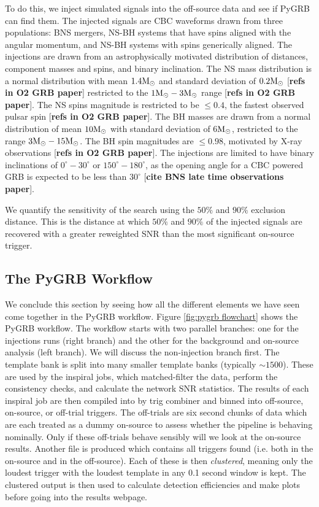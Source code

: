 \documentclass[11pt]{cuthesis}
\begin{document}
To do this, we inject simulated signals into the off-source data and see if PyGRB can find them. The injected signals are CBC waveforms drawn from three populations: BNS mergers, NS-BH systems that have spins aligned with the angular momentum, and NS-BH systems with spins generically aligned. The injections are drawn from an astrophysically motivated distribution of distances, component masses and spins, and binary inclination. The NS mass distribution is a normal distribution with mean $1.4 \textup{M}_\odot$ and standard deviation of $0.2 \textup {M}_\odot$ [\textbf{refs in O2 GRB paper}] restricted to the $1 \textup{M}_\odot-3\textup {M}_\odot$ range [\textbf{refs in O2 GRB paper}]. The NS spins magnitude is restricted to be $\leq 0.4$, the fastest observed pulsar spin [\textbf{refs in O2 GRB paper}]. The BH masses are drawn from a normal distribution of mean $10 \textup{M}_\odot$ with standard deviation of 6$ \textup{M}_\odot$, restricted to the range $3 \textup{M}_\odot-15 \textup{M}_\odot$. The BH spin magnitudes are $\leq 0.98$, motivated by X-ray observations [\textbf{refs in O2 GRB paper}]. The injections are limited to have binary inclinations of $0^\circ-30^\circ$ or $150^\circ-180^\circ$, as the opening angle for a CBC powered GRB is expected to be less than $30^\circ$ [\textbf{cite BNS late time observations paper}]. 

We quantify the sensitivity of the search using the $50\%$ and $90\%$  exclusion distance. This is the distance at which $50\%$ and $90\%$ of the injected signals are recovered with a greater reweighted SNR than the most significant on-source trigger. 


\subsection{The PyGRB Workflow}
We conclude this section by seeing how all the different elements we have seen come together in the PyGRB workflow. Figure \ref{fig:pygrb flowchart} shows the PyGRB workflow. The workflow starts with two parallel branches: one for the injections runs (right branch) and the other for the background and on-source analysis (left branch). We will discuss the non-injection branch first. The template bank is split into many smaller template banks (typically $\sim1500$). These are used by the inspiral jobs, which matched-filter the data, perform the consistency checks, and calculate the network SNR statistics. The results of each inspiral job are then compiled into by trig combiner and binned into off-source, on-source, or off-trial triggers. The off-trials are six second chunks of data which are each treated as a dummy on-source to assess whether the pipeline is behaving nominally. Only if these off-trials behave sensibly will we look at the on-source results. Another file is produced which contains all triggers found (i.e. both in the on-source and in the off-source). Each of these is then \textit{clustered}, meaning only the loudest trigger with the loudest template in any 0.1 second window is kept. The clustered output is then used to calculate detection efficiencies and make plots before going into the results webpage. 
\end{document}
